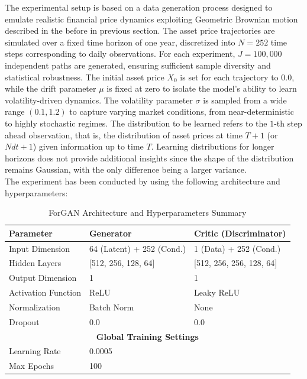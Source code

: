 The experimental setup is based on a data generation process designed to emulate realistic financial price dynamics exploiting Geometric Brownian motion described in the before in previous section. 
The asset price trajectories are simulated over a fixed time horizon of one year, discretized into $N=252$ time steps corresponding to daily observations.
For each experiment, $J=100{,}000$ independent paths are generated, ensuring sufficient sample diversity and statistical robustness.
The initial asset price $X_0$ is set for each trajectory to $0.0$, while the drift parameter $\mu$ is fixed at zero to isolate the model's ability to learn volatility-driven dynamics.
The volatility parameter $\sigma$ is sampled from a wide range $(0.1, 1.2)$ to capture varying market conditions, from near-deterministic to highly stochastic regimes.
The distribution to be learned refers to the $1$-th step ahead observation, that is, the distribution of asset prices at time $T + 1$ (or $N dt + 1$) given information up to time $T$. 
Learning distributions for longer horizons does not provide additional insights since the shape of the distribution remains Gaussian, with the only difference being a larger variance.\\

The experiment has been conducted by using the following architecture and hyperparameters:
\begin{table}[H]
\centering
\caption{ForGAN Architecture and Hyperparameters Summary}
\label{tab:forgan_summary}
\begin{tabular}{lll}
\hline
\textbf{Parameter}         & \textbf{Generator}          & \textbf{Critic (Discriminator)} \\ \hline
Input Dimension            & 64 (Latent) + 252 (Cond.)   & 1 (Data) + 252 (Cond.)          \\
Hidden Layers              & [512, 256, 128, 64]         & [512, 256, 256, 128, 64]        \\
Output Dimension           & 1                           & 1                               \\
Activation Function        & ReLU                        & Leaky ReLU                      \\
Normalization              & Batch Norm                  & None                      \\
Dropout                    & 0.0                         & 0.0                             \\
\multicolumn{3}{c}{\textbf{Global Training Settings}}                                     \\ \hline
Learning Rate              & \multicolumn{2}{l}{0.0005}                                      \\
Max Epochs                 & \multicolumn{2}{l}{100}                                       \\
\end{tabular}
\end{table}

